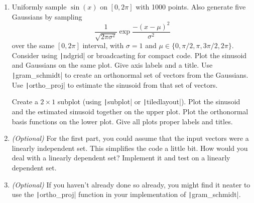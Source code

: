 \documentclass{article}
\begin{document}
\begin{enumerate}
\begin{enumerate}
    \clearpage
  \item Uniformly sample $\sin(x)$ on $[0,2\pi]$ with 1000 points. Also generate five Gaussians by sampling
    \begin{equation*}
      \frac{1}{\sqrt{2\pi\sigma^2}}\exp\frac{-(x-\mu)^2}{\sigma^2}
    \end{equation*}
    over the same $[0,2\pi]$ interval, with $\sigma=1$ and $\mu\in\{0,\pi/2,\pi,3\pi/2,2\pi\}$. Consider using \texttt|ndgrid| or broadcasting for compact code. Plot the sinusoid and Gaussians on the same plot. Give axis labels and a title. Use \texttt|gram_schmidt| to create an orthonormal set of vectors from the Gaussians. Use \texttt|ortho_proj| to estimate the sinusoid from that set of vectors.
    
    Create a $2\times 1$ subplot (using \texttt|subplot| or \texttt|tiledlayout|). Plot the sinusoid and the estimated sinusoid together on the upper plot. Plot the orthonormal basis functions on the lower plot. Give all plots proper labels and titles.
    
  \item \textit{(Optional)} For the first part, you could assume that the input vectors were a linearly independent set. This simplifies the code a little bit. How would you deal with a linearly dependent set? Implement it and test on a linearly dependent set.
    
  \item \textit{(Optional)} If you haven't already done so already, you might find it neater to use the \texttt|ortho_proj| function in your implementation of \texttt|gram_schmidt|.
  \end{enumerate}
\end{enumerate}
\end{document}

